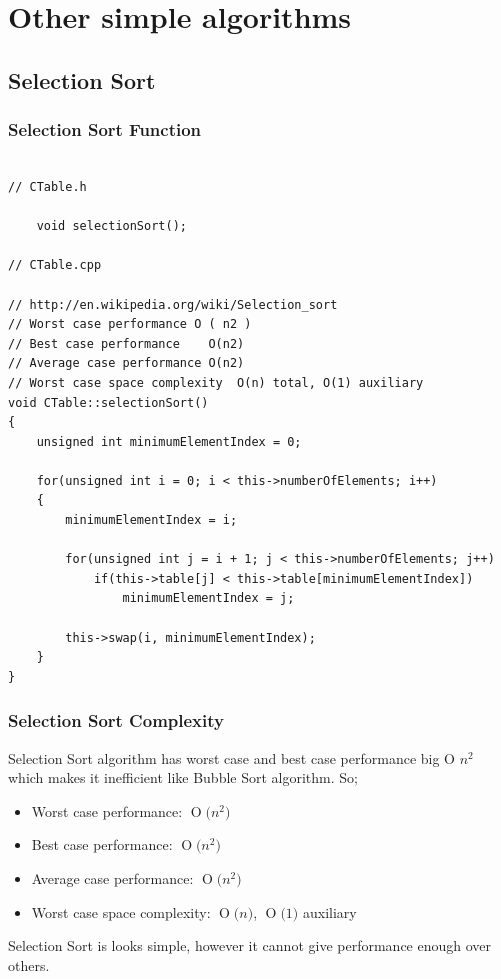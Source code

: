 \documentclass{article}
\newcommand{\BigO}[1]{\ensuremath{\operatorname{O}\bigl(#1\bigr)}}
\begin{document}
	
	
\section{Other simple algorithms}

	\subsection{Selection Sort}
	
		\subsubsection{Selection Sort Function}
		\begin{lstlisting}[label=CTable-selectionSort, caption=Selection Sort]
	
// CTable.h
	
    void selectionSort();
    
// CTable.cpp
    
// http://en.wikipedia.org/wiki/Selection_sort
// Worst case performance O ( n2 )
// Best case performance	O(n2)
// Average case performance	O(n2)
// Worst case space complexity	O(n) total, O(1) auxiliary
void CTable::selectionSort()
{
    unsigned int minimumElementIndex = 0;

    for(unsigned int i = 0; i < this->numberOfElements; i++)
    {
        minimumElementIndex = i;

        for(unsigned int j = i + 1; j < this->numberOfElements; j++)
            if(this->table[j] < this->table[minimumElementIndex])
                minimumElementIndex = j;

        this->swap(i, minimumElementIndex);
    }
}

		\end{lstlisting}
		
		\subsubsection{Selection Sort Complexity}
		Selection Sort algorithm has worst case and best case performance big O \emph{$n^{2}$} which makes it inefficient like Bubble Sort algorithm. So;
		\begin{itemize}
		\item Worst case performance: \BigO{n^{2}}
		\item Best case performance: \BigO{n^{2}}
		\item Average case performance: \BigO{n^{2}}
		\item Worst case space complexity: \BigO{n}, \BigO{1} auxiliary
		\end{itemize}
		Selection Sort is looks simple, however it cannot give performance enough over others.
		
\end{document}
